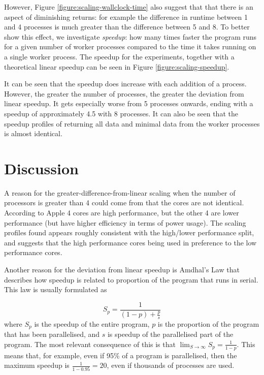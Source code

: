 \documentclass[logo,msc,dsti]{style/infthesis}    %
\begin{document}
{However, Figure \ref{figure:scaling-wallclock-time} also suggest that that there is an aspect of diminishing returns: for example the difference in runtime between 1 and 4 processes is much greater than the difference between 5 and 8. To better show this effect, we investigate \emph{speedup}: how many times faster the program runs for a given number of worker processes compared to the time it takes running on a single worker process. The speedup for the experiments, together with a theoretical linear speedup can be seen in Figure \ref{figure:scaling-speedup}.

It can be seen that the speedup does increase with each addition of a process. However, the greater the number of processes, the greater the deviation from linear speedup. It gets especially worse from 5 processes onwards, ending with a speedup of approximately 4.5 with 8 processes. It can also be seen that the speedup profiles of returning all data and minimal data from the worker processes is almost identical.

\section{Discussion}

A reason for the greater-difference-from-linear scaling when the number of processors is greater than 4 could come from that the cores are not identical. According to Apple \cite{AppleM1Overview} 4 cores are high performance, but the other 4 are lower performance (but have higher efficiency in terms of power usage). The scaling profiles found appears roughly consistent with the high/lower performance split, and suggests that the high performance cores being used in preference to the low performance cores.

Another reason for the deviation from linear speedup is Amdhal's Law that describes how speedup is related to proportion of the program that runs in serial. This law is usually formulated as

\begin{equation}
S_p = \frac{1}{(1-p) + \frac{p}{s}}
\end{equation}
%
where $S_p$ is the speedup of the entire program, $p$ is the proportion of the program that has been parallelised, and $s$ is speedup of the parallelised part of the program. The most relevant consequence of this is that $\lim_{S\to\infty} S_p = \frac{1}{1-p}$. This means that, for example, even if 95\% of a program is parallelised, then the maximum speedup is $\frac{1}{1-0.95}=20$, even if thousands of processes are used.

}
\end{document}
